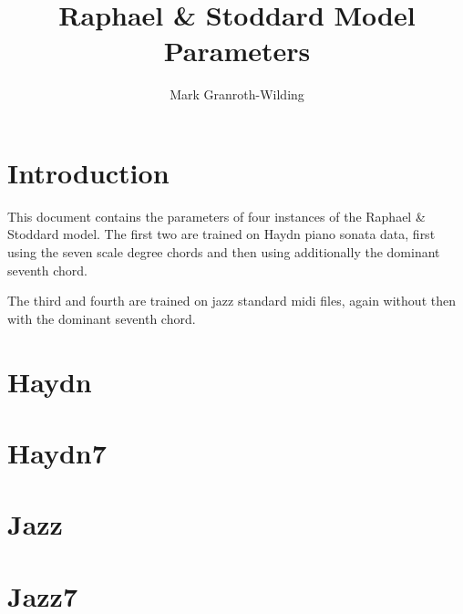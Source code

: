 \documentclass[a4paper]{article}
\title{Raphael \& Stoddard Model Parameters}
\author{Mark Granroth-Wilding}
\begin{document}
\maketitle

\section{Introduction}
This document contains the parameters of four instances of the Raphael \& 
Stoddard model. The first two are trained on Haydn piano sonata data, first
using the seven scale degree chords and then using additionally the dominant 
seventh chord.

The third and fourth are trained on jazz standard midi files, again without 
then with the dominant seventh chord.

\section{Haydn}


\clearpage
\section{Haydn7}


\clearpage
\section{Jazz}


\clearpage
\section{Jazz7}

\end{document}

